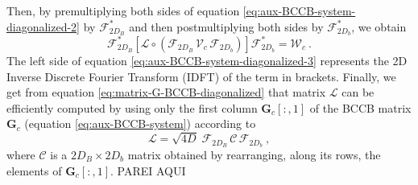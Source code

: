 Then, by premultiplying both sides of equation \ref{eq:aux-BCCB-system-diagonalized-2} 
by $\boldsymbol{\mathcal{F}}_{2D_{B}}^{\ast}$ and then postmultiplying both sides by 
$\boldsymbol{\mathcal{F}}_{2D_{b}}^{\ast}$, we obtain
\begin{equation}
	\boldsymbol{\mathcal{F}}_{2D_{B}}^{\ast} \left[ \boldsymbol{\mathcal{L}} \circ 
	\left( \boldsymbol{\mathcal{F}}_{2D_{B}} \, \boldsymbol{\mathcal{V}}_{c} \, \boldsymbol{\mathcal{F}}_{2D_{b}} \right)
	\right] \boldsymbol{\mathcal{F}}_{2D_{b}}^{\ast} = \boldsymbol{\mathcal{W}}_{c} \: .
	\label{eq:aux-BCCB-system-diagonalized-3}
\end{equation}
The left side of equation \ref{eq:aux-BCCB-system-diagonalized-3} represents the 2D 
Inverse Discrete Fourier Transform (IDFT) of the term in brackets.
Finally, we get from equation \ref{eq:matrix-G-BCCB-diagonalized} that 
matrix $\boldsymbol{\mathcal{L}}$ can be efficiently computed by using only the first column 
$\mathbf{G}_{c}[:,1]$ of the BCCB matrix $\mathbf{G}_{c}$ (equation \ref{eq:aux-BCCB-system})
according to \citep{takahashi-etal2020}
\begin{equation}
	\boldsymbol{\mathcal{L}} = \sqrt{4D} \; 
	\boldsymbol{\mathcal{F}}_{2D_{B}} \, \boldsymbol{\mathcal{C}} \, \boldsymbol{\mathcal{F}}_{2D_{b}} \: ,
	\label{eq:matrix-L}
\end{equation}
where $\boldsymbol{\mathcal{C}}$ is a $2D_{B} \times 2D_{b}$ matrix obtained 
by rearranging, along its rows, the elements of $\mathbf{G}_{c}[:,1]$. PAREI AQUI

